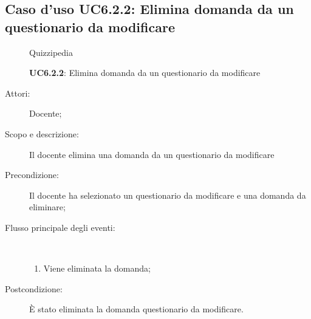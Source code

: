 \subsection{Caso d'uso UC6.2.2: Elimina domanda da un questionario da  modificare}
	\begin{figure}[H]
		\centering
		\begin{resizedtikzpicture}{\textwidth}
		\begin{umlsystem}[x=0, fill=lightgray!20]{Quizzipedia}
		\end{umlsystem}
		\end{resizedtikzpicture}
		\caption{\textbf{UC6.2.2}: Elimina domanda da un questionario da  modificare}
		\label{UC6.2.2}
	\end{figure}
\begin{description}
\item[Attori:] Docente;
\item[Scopo e descrizione:] Il docente elimina una domanda da un questionario da modificare
      \item[Precondizione:] Il docente ha selezionato un questionario da modificare e una domanda da eliminare;

        \item[Flusso principale degli eventi:] \ 
 \begin{enumerate}
          \item Viene eliminata la domanda;

      \end{enumerate}
    \item[Postcondizione:] È stato eliminata la domanda questionario da modificare.
  \end{description}
\hypertarget{UC6.2.3}{}
